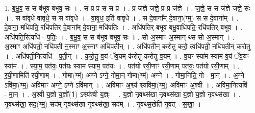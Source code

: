 \documentclass[17pt]{extarticle}
\begin{document}
1. ब॒भू॒व॒ स स ब॑भूव बभूव॒ सः । . स प्र प्र स स प्र । . प्र ज॑ज्ञे जज्ञे॒ प्र प्र ज॑ज्ञे । . ज॒ज्ञे॒ स स ज॑ज्ञे जज्ञे॒ सः । . स वा॑वृधे वावृधे॒ स स वा॑वृधे । . वा॒वृ॒ध॒ इति॑ वावृधे । . स दे॒वाना᳚म् दे॒वाना॒(ग्म्॒) स स दे॒वाना᳚म् । . दे॒वाना॒ मधि॑पति॒ रधि॑पतिर् दे॒वाना᳚म् दे॒वाना॒ मधि॑पतिः । . अधि॑पतिर् बभूव बभू॒वाधि॑पति॒ रधि॑पतिर् बभूव । . अधि॑पति॒रित्यधि॑ - प॒तिः॒ । . ब॒भू॒व॒ स स ब॑भूव बभूव॒ सः । . सो अ॒स्माꣳ अ॒स्मान् थ्स सो अ॒स्मान् । . अ॒स्माꣳ अधि॑पती॒ नधि॑पती न॒स्माꣳ अ॒स्माꣳ अधि॑पतीन् । . अधि॑पतीन् करोतु करो॒ त्वधि॑पती॒ नधि॑पतीन् करोतु । . अधि॑पती॒नित्यधि॑ - प॒ती॒न् । . क॒रो॒तु॒ व॒यं ॅव॒यम् क॑रोतु करोतु व॒यम् । . व॒यꣳ स्या॑म स्याम व॒यं ॅव॒यꣳ स्या॑म । . स्या॒म॒ पत॑यः॒ पत॑यः स्याम स्याम॒ पत॑यः । . पत॑यो रयी॒णाꣳ र॑यी॒णाम् पत॑यः॒ पत॑यो रयी॒णाम् । . र॒यी॒णामिति॑ रयी॒णाम् । . गोमा(ग्म्॑) अग्ने ऽग्ने॒ गोमा॒न् गोमा(ग्म्॑) अग्ने । . गोमा॒निति॒ गो - मा॒न् । . अ॒ग्ने ऽवि॑मा॒(ग्म्॒) अवि॑माꣳ अग्ने॒ ऽग्ने ऽवि॑मान् । . अवि॑माꣳ अ॒श्व्य॑ श्व्यवि॑मा॒(ग्म्॒) अवि॑माꣳ अ॒श्वी । . अवि॑मा॒नित्यवि॑ - मा॒न् । . अ॒श्वी य॒ज्ञो य॒ज्ञो᳚(1॒) ऽश्व्य॑श्वी य॒ज्ञ्ः । . य॒ज्ञो नृ॒वथ्स॑खा नृ॒वथ्स॑खा य॒ज्ञो य॒ज्ञो नृ॒वथ्स॑खा । . नृ॒वथ्स॑खा॒ सद॒(ग्म्॒) सद॑म् नृ॒वथ्स॑खा नृ॒वथ्स॑खा॒ सद᳚म् । . नृ॒वथ्स॒खेति॑ नृ॒वत् - स॒खा॒ । \newline
\end{document}
